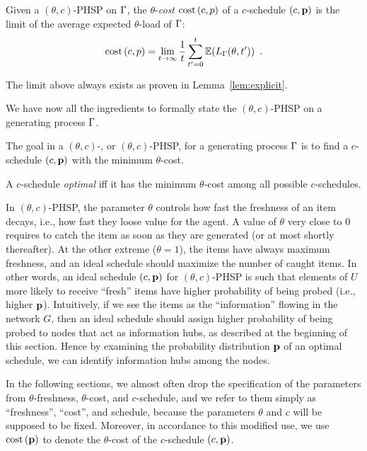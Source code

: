 \begin{definition}
	Given a $(\theta,c)$-PHSP on $\Gamma$, the $\theta$-\emph{cost} $\text{cost}\left( c,p \right)$
	of a $c$-schedule $(c,\mathbf{p})$ is the limit of the average expected
	$\theta$-load of $\Gamma$:
	\[
		\text{cost}\left( c,p \right)=\lim\limits_{t\rightarrow\infty}\frac{1}{t}\sum_{t'=0}^{t}\mathbb{E}(L_\Gamma(\theta,t'))\enspace.
	\]
\end{definition}
The limit above always exists as proven in Lemma~\ref{lem:explicit}.

We have now all the ingredients to formally state the $(\theta,c)$-PHSP on a
generating process $\Gamma$.

\begin{definition}[\probname]\label{def:phsp}
	The goal in a $(\theta,c)$-{\probname}, or $(\theta,c)$-PHSP, for a
	generating process $\Gamma$ is to find a $c$-schedule $(c,\mathbf{p})$ with the
	minimum $\theta$-cost.

	A $c$-schedule \emph{optimal} iff it has the minimum $\theta$-cost among all
	possible $c$-schedules.
\end{definition}

In $(\theta,c)$-PHSP, the parameter $\theta$ controls how fast the freshness of
an item decays, i.e., how fast they loose value for the agent. A value of
$\theta$ very close to $0$ requires to catch the item  as soon as they are
generated (or at most shortly thereafter). At the other extreme ($\theta=1$),
the items have always maximum freshness, and an ideal schedule should maximize
the number of caught items.  In other words, an ideal schedule $(c,\mathbf{p})$ for
$(\theta, c)$-PHSP is such that elements of $U$ more likely to receive ``fresh''
items have higher probability of being probed (i.e., higher $\mathbf{p}$). Intuitively,
if we see the items as the ``information'' flowing in the network $G$, then an
ideal schedule should assign higher probability of being probed to nodes that
act as information hubs, as described at the beginning of this section. Hence by
examining the probability distribution $\mathbf{p}$ of an optimal schedule, we can
identify information hubs among the nodes.

In the following sections, we almost often drop the specification of the
parameters from $\theta$-freshness, $\theta$-cost, and $c$-schedule, and we
refer to them simply as ``freshness'', ``cost'', and schedule, because the
parameters $\theta$ and $c$ will be supposed to be fixed. Moreover, in
accordance to this modified use, we use $\text{cost}\left( \mathbf{p} \right)$ to denote the $\theta$-cost
of the $c$-schedule $(c,\mathbf{p})$.
